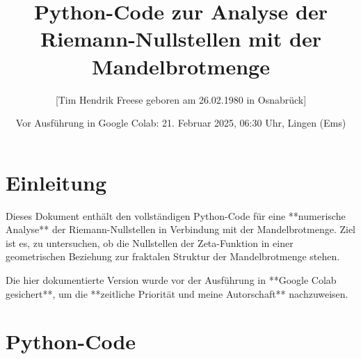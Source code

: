\documentclass[a4paper,12pt]{article}
\title{Python-Code zur Analyse der Riemann-Nullstellen mit der Mandelbrotmenge}
\author{[Tim Hendrik Freese geboren am 26.02.1980 in Osnabrück]}
\date{Vor Ausführung in Google Colab: 21. Februar 2025, 06:30 Uhr, Lingen (Ems)}
\begin{document}
\maketitle

\section{Einleitung}
Dieses Dokument enthält den vollständigen Python-Code für eine **numerische Analyse** der Riemann-Nullstellen in Verbindung mit der Mandelbrotmenge.  
Ziel ist es, zu untersuchen, ob die Nullstellen der Zeta-Funktion in einer geometrischen Beziehung zur fraktalen Struktur der Mandelbrotmenge stehen.  

Die hier dokumentierte Version wurde vor der Ausführung in **Google Colab gesichert**, um die **zeitliche Priorität und meine Autorschaft** nachzuweisen.

\section{Python-Code}
\end{document}
